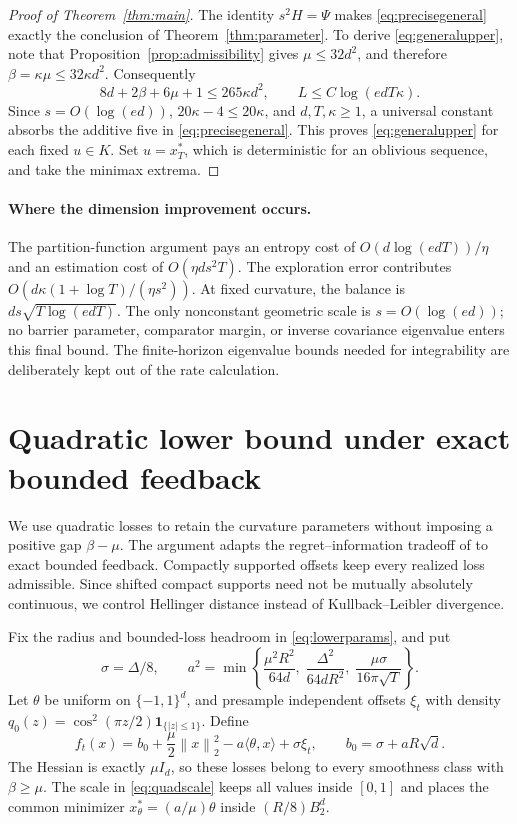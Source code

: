 \documentclass[11pt]{article}
\numberwithin{equation}{section}
\newcommand{\ip}[2]{\langle #1,#2\rangle}
\newcommand{\norm}[1]{\left\|#1\right\|}
\theoremstyle{definition}
\theoremstyle{remark}
\begin{document}
\begin{proof}[Proof of Theorem~\ref{thm:main}]
The identity $s^2H=\Psi$ makes \eqref{eq:precisegeneral} exactly the conclusion
of Theorem~\ref{thm:parameter}. To derive \eqref{eq:generalupper}, note that
Proposition~\ref{prop:admissibility} gives $\mu\leq32d^2$, and therefore
$\beta=\kappa\mu\leq32\kappa d^2$. Consequently
\[
 8d+2\beta+6\mu+1\leq265\kappa d^2,
 \qquad L\leq C\log(edT\kappa).
\]
Since $s=O(\log(ed))$, $20\kappa-4\leq20\kappa$, and $d,T,\kappa\geq1$,
a universal constant absorbs the additive five in \eqref{eq:precisegeneral}.
This proves \eqref{eq:generalupper} for each fixed $u\in K$. Set $u=x_T^*$,
which is deterministic for an oblivious sequence, and take the minimax extrema.
\end{proof}

\paragraph{Where the dimension improvement occurs.}
The partition-function argument pays an entropy cost of
$O(d\log(edT))/\eta$ and an estimation cost of $O(\eta ds^2T)$.
The exploration error contributes
$O(d\kappa(1+\log T)/(\eta s^2))$. At fixed curvature, the balance is $d s\sqrt{T\log(edT)}$.
The only nonconstant geometric scale is $s=O(\log(ed))$; no barrier parameter,
comparator margin, or inverse covariance eigenvalue enters this final bound.
The finite-horizon eigenvalue bounds needed for integrability are deliberately
kept out of the rate calculation.

\section{Quadratic lower bound under exact bounded feedback}\label{sec:lower}
We use quadratic losses to retain the curvature parameters without imposing a
positive gap $\beta-\mu$. The argument adapts the regret--information tradeoff of
\citet[Theorem~6]{Shamir13} to exact bounded feedback. Compactly supported
offsets keep every realized loss admissible. Since shifted compact supports
need not be mutually absolutely continuous, we control Hellinger distance
instead of Kullback--Leibler divergence.

Fix the radius and bounded-loss headroom in \eqref{eq:lowerparams}, and put
\begin{equation}\label{eq:quadscale}
 \sigma=\Delta/8,\qquad
 a^2=\min\!\left\{\frac{\mu^2R^2}{64d},\;
                   \frac{\Delta^2}{64dR^2},\;
                   \frac{\mu\sigma}{16\pi\sqrt T}\right\}.
\end{equation}
Let $\theta$ be uniform on $\{-1,1\}^d$, and presample independent offsets
$\xi_t$ with density
$q_0(z)=\cos^2(\pi z/2)\mathbf1_{\{|z|\leq1\}}$. Define
\begin{equation}\label{eq:lowerfamily}
 f_t(x)=b_0+\frac\mu2\norm{x}_2^2-a\ip{\theta}x+\sigma\xi_t,
 \qquad b_0=\sigma+aR\sqrt d.
\end{equation}
The Hessian is exactly $\mu I_d$, so these losses belong to every smoothness
class with $\beta\geq\mu$. The scale in \eqref{eq:quadscale} keeps all values
inside $[0,1]$ and places the common minimizer
$x_\theta^*=(a/\mu)\theta$ inside $(R/8)B_2^d$.
\end{document}
